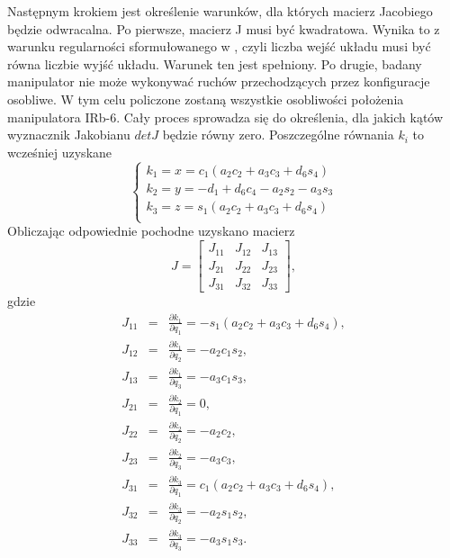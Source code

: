 \documentclass[eng,printmode]{mgr}
\begin{document}
Następnym krokiem jest określenie warunków, dla których macierz Jacobiego będzie odwracalna.
Po pierwsze, macierz J musi być kwadratowa. Wynika to z  warunku regularności sformułowanego w \cite{b3}, czyli liczba wejść układu musi być równa liczbie wyjść układu. Warunek ten jest spełniony.
Po drugie, badany manipulator nie może wykonywać ruchów przechodzących przez konfiguracje osobliwe. W tym celu policzone zostaną wszystkie osobliwości położenia manipulatora IRb-6. Cały proces sprowadza się do określenia, dla jakich kątów wyznacznik Jakobianu $detJ$ będzie równy zero. Poszczególne równania $k_i$ to wcześniej uzyskane
$$
\left\{ \begin{array}{lll}
k_1= x= c_1(a_2c_2+a_3c_3+d_6s_4)\\
k_2= y=-d_1+d_6c_4-a_2s_2-a_3s_3\\
k_3= z=s_1(a_2c_2+a_3c_3+d_6s_4) \\
\end{array} \right.
$$
Obliczając odpowiednie pochodne uzyskano macierz
$$
J=\left[
      \begin{array}{ccc}
         J_{11} & J_{12} & J_{13}\\ 
         J_{21} &J_{22} & J_{23}\\
         J_{31} & J_{32} & J_{33}
         \end{array}
      \right],
      $$
gdzie\\
\begin{eqnarray}
J_{11}&=&\frac{∂k_1}{∂q_1}=-s_1(a_2c_2+a_3c_3+d_6s_4),\\ \nonumber
J_{12}&=&\frac{∂k_1}{∂q_2}=-a_2c_1s_2,\\\nonumber
J_{13}&=&\frac{∂k_1}{∂q_3}=-a_3c_1s_3,\\\nonumber
J_{21}&=&\frac{∂k_2}{∂q_1}=0,\\\nonumber
J_{22}&=&\frac{∂k_2}{∂q_2}=-a_2c_2,\\\nonumber
J_{23}&=&\frac{∂k_2}{∂q_3}=-a_3c_3,\\\nonumber
J_{31}&=&\frac{∂k_3}{∂q_1}=c_1(a_2c_2+a_3c_3+d_6s_4),\\\nonumber
J_{32}&=&\frac{∂k_3}{∂q_2}=-a_2s_1s_2,\\\nonumber
J_{33}&=&\frac{∂k_3}{∂q_3}=-a_3s_1s_3.\nonumber
\end{eqnarray}
\end{document}
